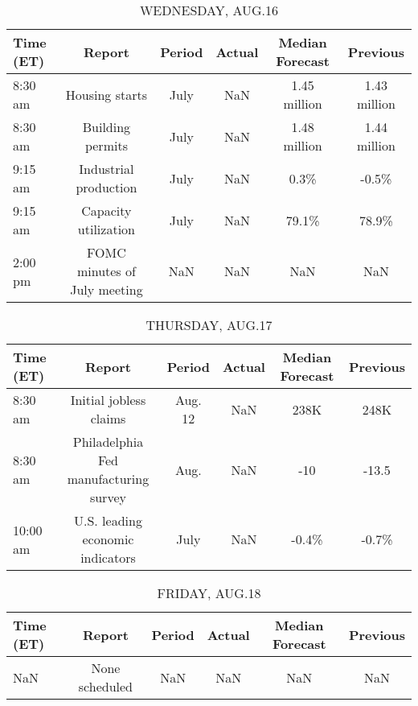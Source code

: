\documentclass{article}%
\begin{document}
\begin{table}[htbp]%
\caption{WEDNESDAY, AUG.16}%
\centering%
\begin{adjustbox}{width=1\textwidth}%
\begin{tabular}{lccccc}
\toprule
Time (ET) &                       Report & Period & Actual & Median Forecast &     Previous \\
\midrule
  8:30 am &               Housing starts &   July &    NaN &    1.45 million & 1.43 million \\
  8:30 am &             Building permits &   July &    NaN &    1.48 million & 1.44 million \\
  9:15 am &        Industrial production &   July &    NaN &            0.3\% &        -0.5\% \\
  9:15 am &         Capacity utilization &   July &    NaN &           79.1\% &        78.9\% \\
  2:00 pm & FOMC minutes of July meeting &    NaN &    NaN &             NaN &          NaN \\
\bottomrule
\end{tabular}
%
\end{adjustbox}%
\end{table}

%


\begin{table}[htbp]%
\caption{THURSDAY, AUG.17}%
\centering%
\begin{adjustbox}{width=1\textwidth}%
\begin{tabular}{lccccc}
\toprule
Time (ET) &                                Report &  Period & Actual & Median Forecast & Previous \\
\midrule
  8:30 am &                Initial jobless claims & Aug. 12 &    NaN &            238K &     248K \\
  8:30 am & Philadelphia Fed manufacturing survey &    Aug. &    NaN &             -10 &    -13.5 \\
 10:00 am &      U.S. leading economic indicators &    July &    NaN &           -0.4\% &    -0.7\% \\
\bottomrule
\end{tabular}
%
\end{adjustbox}%
\end{table}

%


\begin{table}[htbp]%
\caption{FRIDAY, AUG.18}%
\centering%
\begin{adjustbox}{width=1\textwidth}%
\begin{tabular}{lccccc}
\toprule
Time (ET) &         Report & Period & Actual & Median Forecast & Previous \\
\midrule
      NaN & None scheduled &    NaN &    NaN &             NaN &      NaN \\
\bottomrule
\end{tabular}
%
\end{adjustbox}%
\end{table}
\end{document}
